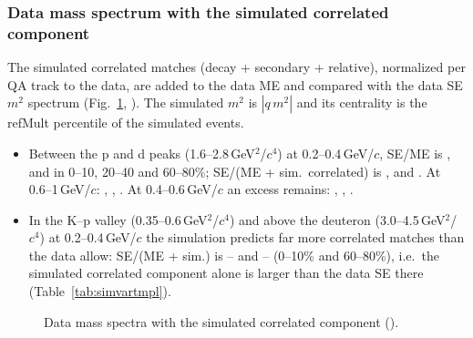 

\subsubsection{Data mass spectrum with the simulated correlated component}
\label{sec:simtmpl}
The simulated correlated matches (decay + secondary + relative), normalized per QA track to the data, are added to the data ME and
compared with the data SE $m^2$ spectrum (Fig.~\ref{fig:simtmpl}, ). The simulated $m^2$ is
$|q\,m^2|$ and its centrality is the refMult percentile of the simulated events.
\begin{itemize}
\item Between the p and d peaks (1.6--2.8\,GeV$^2$/$c^4$) at 0.2--0.4\,GeV/$c$, SE/ME is \tmplFastRatMECiA, \tmplFastRatMEMidA{} and
  \tmplFastRatMEPerA{} in 0--10, 20--40 and 60--80\%; SE/(ME + sim.\ correlated) is \tmplFastRatSumCiA, \tmplFastRatSumMidA{} and
  \tmplFastRatSumPerA. At 0.6--1\,GeV/$c$: \tmplFastRatSumCiC, \tmplFastRatSumMidC, \tmplFastRatSumPerC. At 0.4--0.6\,GeV/$c$ an excess
  remains: \tmplFastRatSumCiB, \tmplFastRatSumMidB, \tmplFastRatSumPerB.
\item In the K--p valley (0.35--0.6\,GeV$^2$/$c^4$) and above the deuteron (3.0--4.5\,GeV$^2$/$c^4$) at 0.2--0.4\,GeV/$c$ the simulation
  predicts far more correlated matches than the data allow: SE/(ME + sim.) is \tmplFastRatSumLoCiA--\tmplFastRatSumLoPerA{} and
  \tmplFastRatSumHiCiA--\tmplFastRatSumHiPerA{} (0--10\% and 60--80\%), i.e.\ the simulated correlated component alone is larger than the
  data SE there (Table~\ref{tab:simvartmpl}).
\end{itemize}



\begin{figure}[H]
\centering
{}
\caption{Data mass spectra with the simulated correlated component ().}
\label{fig:simtmpl}
\end{figure}

